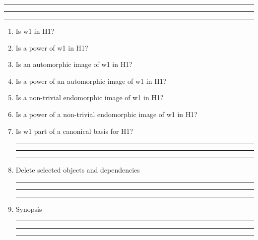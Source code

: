 
\bigskip
\hrule\hrule\hrule

\begin{enumerate}

\item Is w1 in H1?

\item Is a power of w1 in H1?

\item Is an automorphic image of w1 in H1?

\item Is a power of an automorphic image of w1 in H1?

\item Is a non-trivial endomorphic image of w1 in H1?

\item Is a power of a non-trivial endomorphic image of w1 in H1?

\item Is w1 part of a canonical basis for H1?

\bigskip
\hrule\hrule\hrule

\item Delete selected objects and dependencies

\bigskip
\hrule\hrule\hrule

\item
Synopsis

\bigskip
\hrule\hrule\hrule

\end{enumerate}
